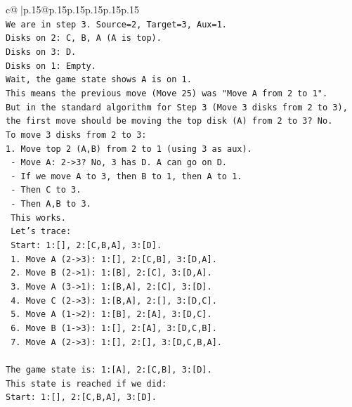 \documentclass{article}
\begin{document}
{\begin{supertabular}{c@{$\;$}|p{.15\linewidth}@{}p{.15\linewidth}p{.15\linewidth}p{.15\linewidth}p{.15\linewidth}p{.15\linewidth}}
{{{\\ 
\texttt{We are in step 3. Source=2, Target=3, Aux=1.} \\
\texttt{Disks on 2: C, B, A (A is top).} \\
\texttt{Disks on 3: D.} \\
\texttt{Disks on 1: Empty.} \\
\texttt{Wait, the game state shows A is on 1.} \\
\texttt{This means the previous move (Move 25) was "Move A from 2 to 1".} \\
\texttt{But in the standard algorithm for Step 3 (Move 3 disks from 2 to 3), the first move should be moving the top disk (A) from 2 to 3? No.} \\
\texttt{To move 3 disks from 2 to 3:} \\
\texttt{1. Move top 2 (A,B) from 2 to 1 (using 3 as aux).} \\
\texttt{   {-} Move A: 2{-}>3? No, 3 has D. A can go on D.} \\
\texttt{   {-} If we move A to 3, then B to 1, then A to 1.} \\
\texttt{   {-} Then C to 3.} \\
\texttt{   {-} Then A,B to 3.} \\
\texttt{   This works.} \\
\texttt{   Let's trace:} \\
\texttt{   Start: 1:{[}{]}, 2:{[}C,B,A{]}, 3:{[}D{]}.} \\
\texttt{   1. Move A (2{-}>3): 1:{[}{]}, 2:{[}C,B{]}, 3:{[}D,A{]}.} \\
\texttt{   2. Move B (2{-}>1): 1:{[}B{]}, 2:{[}C{]}, 3:{[}D,A{]}.} \\
\texttt{   3. Move A (3{-}>1): 1:{[}B,A{]}, 2:{[}C{]}, 3:{[}D{]}.} \\
\texttt{   4. Move C (2{-}>3): 1:{[}B,A{]}, 2:{[}{]}, 3:{[}D,C{]}.} \\
\texttt{   5. Move A (1{-}>2): 1:{[}B{]}, 2:{[}A{]}, 3:{[}D,C{]}.} \\
\texttt{   6. Move B (1{-}>3): 1:{[}{]}, 2:{[}A{]}, 3:{[}D,C,B{]}.} \\
\texttt{   7. Move A (2{-}>3): 1:{[}{]}, 2:{[}{]}, 3:{[}D,C,B,A{]}.} \\
\\ 
\texttt{The game state is: 1:{[}A{]}, 2:{[}C,B{]}, 3:{[}D{]}.} \\
\texttt{This state is reached if we did:} \\
\texttt{Start: 1:{[}{]}, 2:{[}C,B,A{]}, 3:{[}D{]}.} \\
}}}
\end{supertabular}}
\end{document}
